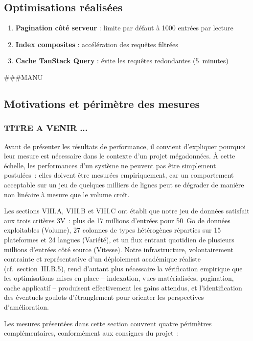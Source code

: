 \documentclass[10pt,twocolumn,a4paper]{article}
\begin{document}
\subsection{Optimisations réalisées}

\begin{enumerate}
    \item \textbf{Pagination côté serveur} : limite par défaut à 1000 entrées par lecture
    \item \textbf{Index composites} : accélération des requêtes filtrées
    \item \textbf{Cache TanStack Query} : évite les requêtes redondantes (5~minutes)
\end{enumerate}

###MANU

\subsection{Motivations et périmètre des mesures}
\subsubsection{TITRE A VENIR ...}

Avant de présenter les résultats de performance, il convient
d'expliquer pourquoi leur mesure est nécessaire dans le contexte
d'un projet mégadonnées. À cette échelle, les performances d'un
système ne peuvent pas être simplement postulées~: elles doivent
être mesurées empiriquement, car un comportement acceptable sur
un jeu de quelques milliers de lignes peut se dégrader de manière
non linéaire à mesure que le volume croît.

Les sections VIII.A, VIII.B et VIII.C ont établi que notre jeu de
données satisfait aux trois critères 3V~: plus de 17 millions
d'entrées pour 50~Go de données exploitables (Volume), 27 colonnes
de types hétérogènes réparties sur 15 plateformes et 24 langues
(Variété), et un flux entrant quotidien de plusieurs millions
d'entrées côté source (Vitesse). Notre infrastructure, volontairement
contrainte et représentative d'un déploiement académique réaliste
(cf.\ section~III.B.5), rend d'autant plus nécessaire la vérification
empirique que les optimisations mises en place -- indexation, vues
matérialisées, pagination, cache applicatif -- produisent effectivement
les gains attendus, et l'identification des éventuels goulots
d'étranglement pour orienter les perspectives d'amélioration.

Les mesures présentées dans cette section couvrent quatre périmètres
complémentaires, conformément aux consignes du projet~:
\end{document}
